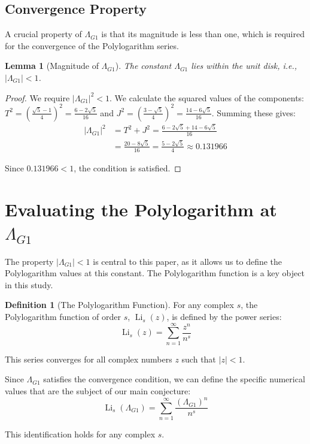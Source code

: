 \documentclass{amsart}
\theoremstyle{plain}
\newtheorem{lemma}[theorem]{Lemma}
\theoremstyle{definition}
\newtheorem{definition}[theorem]{Definition}
\theoremstyle{remark}
\DeclareMathOperator{\Li}{Li} %
\newcommand{\LambdaG}{\Lambda_{G1}}
\begin{document}
\subsection{Convergence Property}
A crucial property of $\LambdaG$ is that its magnitude is less than one, which is required for the convergence of the Polylogarithm series.
\begin{lemma}[Magnitude of $\LambdaG$]
\label{lem:convergence}
The constant $\LambdaG$ lies within the unit disk, i.e., $|\LambdaG| < 1$.
\end{lemma}
\begin{proof}
We require $|\LambdaG|^2 < 1$. We calculate the squared values of the components: $T^2 = \left(\frac{\sqrt{5}-1}{4}\right)^2 = \frac{6-2\sqrt{5}}{16}$ and $J^2 = \left(\frac{3-\sqrt{5}}{4}\right)^2 = \frac{14-6\sqrt{5}}{16}$. Summing these gives:
\begin{align*}
    |\LambdaG|^2 &= T^2+J^2 = \frac{6-2\sqrt{5} + 14-6\sqrt{5}}{16} \\
                 &= \frac{20-8\sqrt{5}}{16} = \frac{5-2\sqrt{5}}{4} \approx 0.131966
\end{align*}

Since $0.131966 < 1$, the condition is satisfied.
\end{proof}

\section{Evaluating the Polylogarithm at \texorpdfstring{$\LambdaG$}{Lambda\_G1}}
The property $|\LambdaG| < 1$ is central to this paper, as it allows us to define the Polylogarithm values at this constant. The Polylogarithm function is a key object in this study.
\begin{definition}[The Polylogarithm Function]
For any complex $s$, the Polylogarithm function of order $s$, $\Li_s(z)$, is defined by the power series:
\[ \Li_s(z) = \sum_{n=1}^{\infty} \frac{z^n}{n^s} \]

This series converges for all complex numbers $z$ such that $|z|<1$.
\end{definition}

Since $\LambdaG$ satisfies the convergence condition, we can define the specific numerical values that are the subject of our main conjecture:
\[ \Li_s(\LambdaG) = \sum_{n=1}^{\infty} \frac{(\LambdaG)^{n}}{n^s} \]

This identification holds for any complex $s$.
\end{document}
